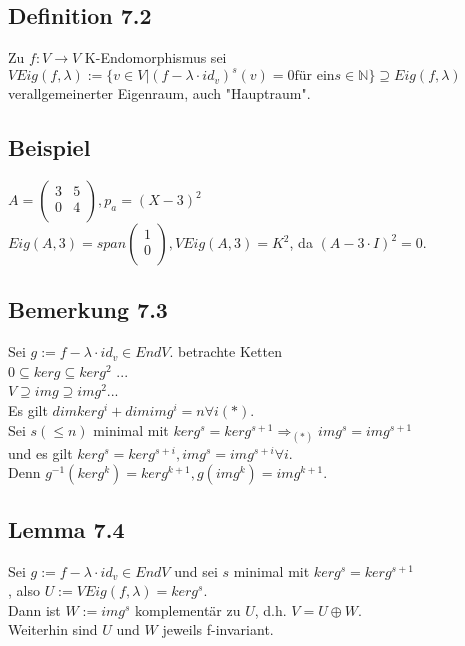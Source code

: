 \documentclass[a4paper, 12pt]{extarticle}
\begin{document}
\subsection*{Definition 7.2}
Zu $ f: V \rightarrow V$ K-Endomorphismus sei $VEig(f, \lambda) := \{ v \in V | (f - \lambda \cdot id_v)^s(v) = 0 \text{für ein} s \in \mathbb{N} \}\supseteq Eig(f, \lambda)$ verallgemeinerter Eigenraum, auch "Hauptraum".
\subsection*{Beispiel}
$A = 
\left( \begin{matrix}
	3 & 5 \\
	0 & 4 \\
\end{matrix} \right),
p_a = (X-3)^2$\\
$Eig(A,3) = span{\left(\begin{matrix}
		1 \\
		0 \\
	\end{matrix}\right)}, VEig(A,3) = K^2$, da $(A-3\cdot I)^2 = 0$.
\subsection*{Bemerkung 7.3}
Sei $g:= f - \lambda \cdot id_v \in EndV.$ betrachte Ketten\\ 
${0} \subseteq kerg \subseteq kerg^2$ ...\\
$V \supseteq img \supseteq img^2$...\\
Es gilt $dim kerg^i + dim img^i = n \forall i (*).$\\
Sei $s (\leq n)$ minimal mit $kerg^s = kerg^{s+1} \Rightarrow_{(*)} img^s = im g^{s+1}$\\
 und es gilt $kerg^s = kerg^{s+i}, img^s = img^{s+i} \forall i$.\\
Denn $g^{-1}(kerg^k) = kerg^{k+1}, g(img^k) = img^{k+1}$.
\subsection*{Lemma 7.4}
Sei $g:= f - \lambda \cdot id_v \in EndV$ und sei $s$ minimal mit $kerg^s = kerg^{s+1}$\\
, also $U:= VEig(f, \lambda) = kerg^s$.\\
Dann ist $W:= img^s$ komplementär zu $U$, d.h. $V = U \oplus W$.\\
Weiterhin sind $U$ und $W$ jeweils f-invariant.
\end{document}

